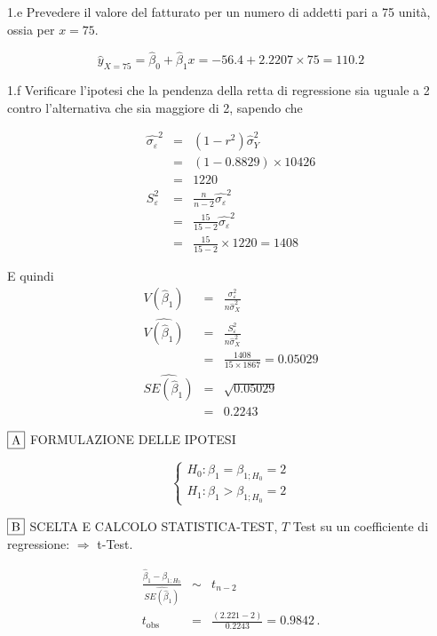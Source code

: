 \documentclass[
  11pt,
]{book}
\theoremstyle{mytheoremstyle}
\theoremstyle{mydefstyle}
\newenvironment{sol}
  {
  \begin{tcolorbox}[enhanced,breakable,arc=0.1mm,boxrule=1pt,colback=white,colframe=iblue,
  title=\bf \fontfamily{lmss}\selectfont \hspace{.5 cm} Soluzione,drop fuzzy shadow]

}{
\end{tcolorbox}
  }
\begin{document}
1.e Prevedere il valore del fatturato per un numero
di addetti pari a 75 unità, ossia per \(x=75\).

\begin{sol}
\[\hat y_{X= 75 }=\hat\beta_0+\hat\beta_1 x= -56.4 + 2.2207 \times 75 = 110.2 \]

\end{sol}

1.f Verificare
l'ipotesi che la pendenza della retta di regressione sia uguale a
2 contro l'alternativa che sia maggiore di 2, sapendo che

\begin{sol}
\begin{eqnarray*}
\hat{\sigma_\varepsilon}^2&=&(1-r^2)\hat\sigma_Y^2\\
&=& (1- 0.8829 )\times 10426 \\
   &=&  1220 \\
   S_\varepsilon^2 &=& \frac{n} {n-2} \hat{\sigma_\varepsilon}^2\\
   &=&  \frac{ 15 } { 15 -2} \hat{\sigma_\varepsilon}^2 \\
 &=&  \frac{ 15 } { 15 -2} \times  1220  =  1408  
\end{eqnarray*}

E quindi\begin{eqnarray*}
V(\hat\beta_{1}) &=& \frac{\sigma_{\varepsilon}^{2}} {n \hat{\sigma}^{2}_{X}} \\
\widehat{V(\hat\beta_{1})} &=& \frac{S_{\varepsilon}^{2}} {n \hat{\sigma}^{2}_{X}} \\
 &=& \frac{ 1408 } { 15 \times  1867 } =  0.05029 \\
 \widehat{SE(\hat\beta_{1})}        &=&  \sqrt{ 0.05029 }\\
 &=&  0.2243 
\end{eqnarray*}

\(\fbox{A}\) FORMULAZIONE DELLE IPOTESI

\[\begin{cases}
   H_0: \beta_1 = \beta_{1;H_0}=2 \\
   H_1: \beta_1 > \beta_{1;H_0}=2 
   \end{cases}\]

\(\fbox{B}\) SCELTA E CALCOLO STATISTICA-TEST, \(T\)
Test su un coefficiente di regressione: \(\Rightarrow\) t-Test.

\begin{eqnarray*}
 \frac{\hat\beta_{ 1 } - \beta_{ 1 ;H_0}} {\widehat{SE(\hat\beta_{ 1 })}}&\sim&t_{n-2}\\
   t_{\text{obs}}
&=& \frac{ ( 2.221 -  2 )} { 0.2243 }
 =   0.9842 \, .
\end{eqnarray*}


\end{sol}
\end{document}
